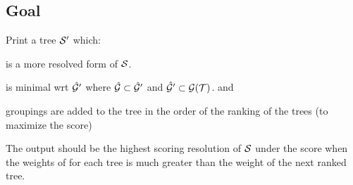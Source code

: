 \documentclass[11pt]{article}
\begin{document}
\subsection*{Goal}
Print a tree $\mathcal{S}^{\prime}$ which:
\begin{compactitem}
    \item is a more resolved form of $\mathcal{S}$.
    \item is minimal wrt $\hat{\mathcal{G}}^{\prime}$ where $\hat{\mathcal{G}} \subset \hat{\mathcal{G}}^{\prime}$ and $\hat{\mathcal{G}}^{\prime} \subset \mathcal{G}(\mathcal{T})$. and 
    \item groupings are added to the tree in the order of the ranking of the trees (to maximize the \SWIPSD score)
\end{compactitem}

The output should be the highest scoring resolution of $\mathcal{S}$ under the \SWIPSD score when the
    weights of for each tree is much greater than the weight of the next ranked tree.
\end{document}
